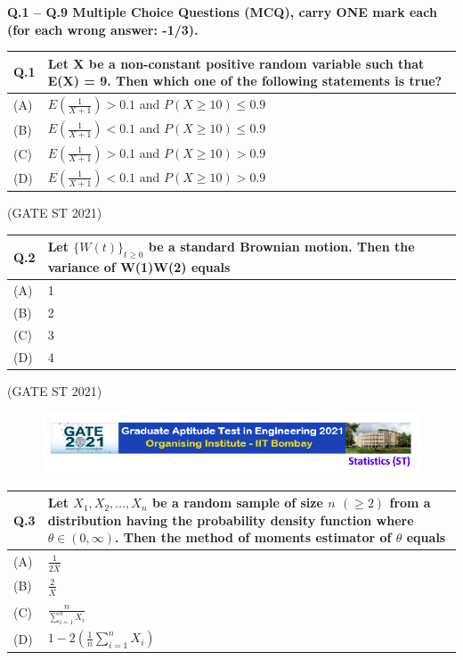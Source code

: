 \documentclass[journal,12pt,onecolumn]{IEEEtran}
\theoremstyle{remark}
\begin{document}
\newpage
\textbf{Q.1 -- Q.9 Multiple Choice Questions (MCQ), carry ONE mark each (for each wrong answer: -1/3).}

\bigskip\bigskip

\begin{tabular}{|p{1cm}|p{12.5cm}|}
\hline
\textbf{Q.1} & \textbf{Let X be a non-constant positive random variable such that E(X) = 9. Then which one of the following statements is true?}\\
\hline
(A) & $E\left(\frac{1}{X+1}\right) > 0.1$ and $P(X \geq 10) \leq 0.9$ \bigskip \\
\hline
(B) & $E\left(\frac{1}{X+1}\right) < 0.1$ and $P(X \geq 10) \leq 0.9$ \bigskip \\
\hline
(C) & $E\left(\frac{1}{X+1}\right) > 0.1$ and $P(X \geq 10) > 0.9$ \bigskip\\
\hline
(D) & $E\left(\frac{1}{X+1}\right) < 0.1$ and $P(X \geq 10) > 0.9$ \bigskip\\
\hline
\end{tabular}

\bigskip\bigskip
\hfill (GATE ST 2021)
\\

\begin{tabular}{|p{1cm}|p{12.5cm}|}
\hline
\textbf{Q.2} & \textbf{Let $\{W(t)\}_{t \geq 0}$ be a standard Brownian motion. Then the variance of W(1)W(2) equals} \\
\hline
(A) & 1 \\
\hline
(B) & 2 \\ 
\hline
(C) & 3 \\
\hline
(D) & 4 \\
\hline

\end{tabular}

\hfill (GATE ST 2021)
\\

\newpage
\begin{figure}
\huge\centering
    \includegraphics[width=1\linewidth]{figs/0.png}
\end{figure}

\begin{tabular}{|p{1cm}|p{12.5cm}|}
\hline
\textbf{Q.3} & \textbf{Let $X_1, X_2, \dots, X_n$ be a random sample of size $n$ $(\geq 2)$ from a distribution having the probability density function}
 where $\theta \in (0, \infty)$. Then the method of moments estimator of $\theta$ equals\\ 
 \hline
 (A) &  $\frac{1}{2 \overline{X}}$ \bigskip \\
\hline
(B) & $\frac{2}{\overline{X}}$ \bigskip \\
\hline
(C) & $\frac{n}{\sum_{i=1}^n X_i}$ \bigskip \\
\hline
(D) & $1 - 2\left(\frac{1}{n}\sum_{i=1}^n X_i \right)$ \bigskip \\
\hline
\end{tabular}
\end{document}

